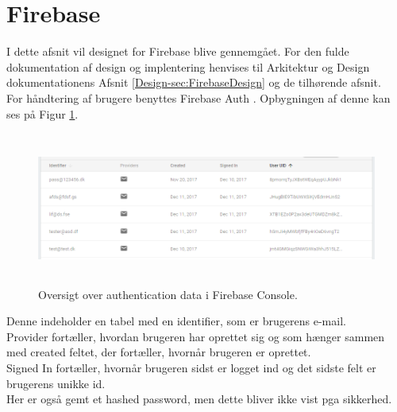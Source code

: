 \section{Firebase}
I dette afsnit vil designet for Firebase blive gennemgået. For den fulde dokumentation af design og implentering henvises til Arkitektur og Design dokumentationens Afsnit \ref{Design-sec:FirebaseDesign} og de tilhørende afsnit. \\

For håndtering af brugere benyttes Firebase Auth \cite{FirebaseAuth}. Opbygningen af denne kan ses på Figur \ref{fig:FirebaseAuthPNG}.

\begin{figure}[H] %
	\centering
	\includegraphics[height=5cm, width=15cm]{Design/Firebase/FirebaseAuth}
	\caption{Oversigt over authentication data i Firebase Console.}
	\label{fig:FirebaseAuthPNG}
\end{figure}
Denne indeholder en tabel med en identifier, som er brugerens e-mail. \\
Provider fortæller, hvordan brugeren har oprettet sig og som hænger sammen med created feltet, der fortæller, hvornår brugeren er oprettet. \\
Signed In fortæller, hvornår brugeren sidst er logget ind og det sidste felt er brugerens unikke id. \\
Her er også gemt et hashed password, men dette bliver ikke vist pga sikkerhed. \\

\clearpage

